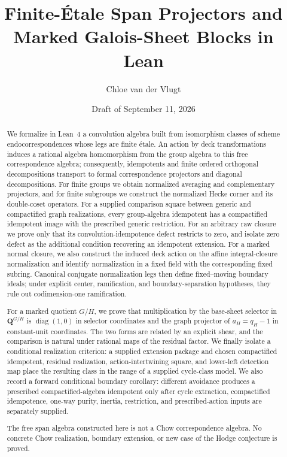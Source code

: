\documentclass[11pt]{article}
\title{Finite-\'Etale Span Projectors and\\
  Marked Galois-Sheet Blocks in Lean}
\author{Chloe van der Vlugt}
\date{Draft of September 11, 2026}
\theoremstyle{definition}
\theoremstyle{remark}
\newcommand{\Q}{\mathbf Q}
\begin{document}
\maketitle

\begin{abstract}
We formalize in Lean~4 a convolution algebra built from isomorphism classes
of scheme endocorrespondences whose legs are finite \'etale.  An action by
deck transformations induces a rational algebra homomorphism from the group
algebra to this free correspondence algebra; consequently, idempotents and
finite ordered orthogonal decompositions transport to formal correspondence
projectors and diagonal decompositions.  For finite groups we obtain
normalized averaging and complementary projectors, and for finite subgroups
we construct the normalized Hecke corner and its double-coset operators.  For
a supplied comparison square between generic and compactified graph
realizations, every group-algebra idempotent has a compactified idempotent
image with the prescribed generic restriction.  For an arbitrary raw closure
we prove only that its convolution-idempotence defect restricts to zero, and
isolate zero defect as the additional condition recovering an idempotent
extension.  For
a marked normal closure, we also construct the induced deck action on the
affine integral-closure normalization and identify normalization in a fixed
field with the corresponding fixed subring.  Canonical conjugate
normalization legs then define fixed--moving boundary ideals; under explicit
center, ramification, and boundary-separation hypotheses, they rule out
codimension-one ramification.

For a marked quotient \(G/H\), we prove that multiplication by the base-sheet
selector in \(\Q^{G/H}\) is \(\operatorname{diag}(1,0)\) in selector
coordinates and the graph projector of \(a_H=q_H-1\) in constant-unit coordinates.
The two forms are related by an explicit shear, and the comparison is natural
under rational maps of the residual factor.  We finally isolate a conditional
realization criterion: a supplied extension package and chosen compactified
idempotent, residual realization, action-intertwining square, and lower-left
detection map place the resulting class in the range of a supplied
cycle-class model.
We also record a forward conditional boundary corollary: different avoidance
produces a prescribed compactified-algebra idempotent only after cycle
extraction, compactified idempotence, one-way purity, inertia, restriction,
and prescribed-action inputs are separately supplied.

The free span algebra constructed here is not a Chow correspondence algebra.
No concrete Chow realization, boundary extension, or new case of the Hodge
conjecture is proved.
\end{abstract}
\end{document}
